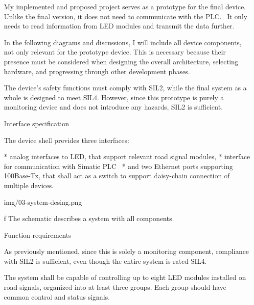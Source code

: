 My implemented and proposed project serves as a prototype for the final device. Unlike the final version, it does not need to communicate with the PLC.~ It only needs to read information from LED modules and transmit the data further.  

In the following diagrams and discussions, I will include all device components, not only relevant for the prototype device. This is necessary because their presence must be considered when designing the overall architecture, selecting hardware, and progressing through other development phases.

The device's safety functions must comply with SIL2, while the final system as a whole is designed to meet SIL4. However, since this prototype is purely a monitoring device and does not introduce any hazards, SIL2 is sufficient.

\secc Interface specification

The device shell provides three interfaces:

\begitems
* {\sbf analog interfaces} to LED, that support relevant road signal modules,
* interface for {\sbf communication with Simatic PLC}~
* and {\sbf two Ethernet ports} supporting 100Base-Tx, that shall act as a switch to support daisy-chain connection of multiple devices.
\enditems

\medskip
{}
\picw=12cm \cinspic img/03-system-desing.png
\caption/f The schematic describes a system with all components.
\medskip

\secc Function requirements

As previously mentioned, since this is solely a monitoring component, compliance with SIL2 is sufficient, even though the entire system is rated SIL4. 

The system shall be capable of controlling up to eight LED modules installed on road signals, organized into at least three groups. Each group should have common control and status signals. 

